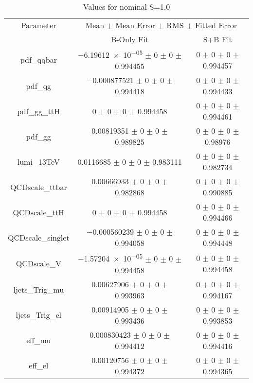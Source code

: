 \begin{table}
\centering
\caption{Values for nominal S=1.0}
\begin{tabular}{ccc}
\toprule
Parameter 	& \multicolumn{2}{c}{Mean $\pm$ Mean Error $\pm$ RMS $\pm$ Fitted Error}\\
 	& B-Only Fit & S+B Fit\\
\midrule
pdf\_qqbar 	& \num{-6.19612e-05} $\pm$ \num{0} $\pm$ \num{0} $\pm$ \num{0.994455} 	& \num{0} $\pm$ \num{0} $\pm$ \num{0} $\pm$ \num{0.994457}\\
pdf\_qg 	& \num{-0.000877521} $\pm$ \num{0} $\pm$ \num{0} $\pm$ \num{0.994418} 	& \num{0} $\pm$ \num{0} $\pm$ \num{0} $\pm$ \num{0.994433}\\
pdf\_gg\_ttH 	& \num{0} $\pm$ \num{0} $\pm$ \num{0} $\pm$ \num{0.994458} 	& \num{0} $\pm$ \num{0} $\pm$ \num{0} $\pm$ \num{0.994461}\\
pdf\_gg 	& \num{0.00819351} $\pm$ \num{0} $\pm$ \num{0} $\pm$ \num{0.989825} 	& \num{0} $\pm$ \num{0} $\pm$ \num{0} $\pm$ \num{0.98976}\\
lumi\_13TeV 	& \num{0.0116685} $\pm$ \num{0} $\pm$ \num{0} $\pm$ \num{0.983111} 	& \num{0} $\pm$ \num{0} $\pm$ \num{0} $\pm$ \num{0.982734}\\
QCDscale\_ttbar 	& \num{0.00666933} $\pm$ \num{0} $\pm$ \num{0} $\pm$ \num{0.982868} 	& \num{0} $\pm$ \num{0} $\pm$ \num{0} $\pm$ \num{0.990885}\\
QCDscale\_ttH 	& \num{0} $\pm$ \num{0} $\pm$ \num{0} $\pm$ \num{0.994458} 	& \num{0} $\pm$ \num{0} $\pm$ \num{0} $\pm$ \num{0.994466}\\
QCDscale\_singlet 	& \num{-0.000560239} $\pm$ \num{0} $\pm$ \num{0} $\pm$ \num{0.994058} 	& \num{0} $\pm$ \num{0} $\pm$ \num{0} $\pm$ \num{0.994448}\\
QCDscale\_V 	& \num{-1.57204e-05} $\pm$ \num{0} $\pm$ \num{0} $\pm$ \num{0.994458} 	& \num{0} $\pm$ \num{0} $\pm$ \num{0} $\pm$ \num{0.994458}\\
ljets\_Trig\_mu 	& \num{0.00627906} $\pm$ \num{0} $\pm$ \num{0} $\pm$ \num{0.993963} 	& \num{0} $\pm$ \num{0} $\pm$ \num{0} $\pm$ \num{0.994167}\\
ljets\_Trig\_el 	& \num{0.00914905} $\pm$ \num{0} $\pm$ \num{0} $\pm$ \num{0.993436} 	& \num{0} $\pm$ \num{0} $\pm$ \num{0} $\pm$ \num{0.993853}\\
eff\_mu 	& \num{0.000830423} $\pm$ \num{0} $\pm$ \num{0} $\pm$ \num{0.994412} 	& \num{0} $\pm$ \num{0} $\pm$ \num{0} $\pm$ \num{0.994416}\\
eff\_el 	& \num{0.00120756} $\pm$ \num{0} $\pm$ \num{0} $\pm$ \num{0.994372} 	& \num{0} $\pm$ \num{0} $\pm$ \num{0} $\pm$ \num{0.994365}\\

\end{tabular}
\end{table}
